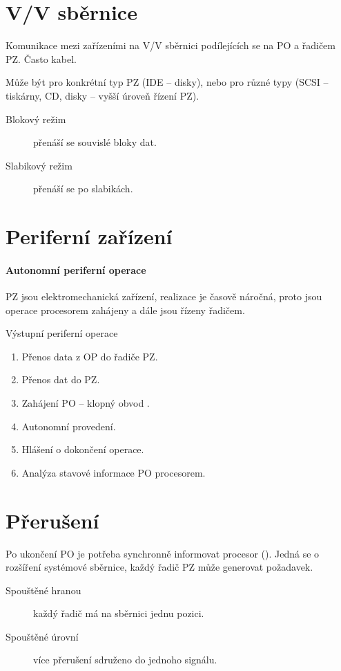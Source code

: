 \documentclass[a4wide]{report}
\begin{document}
\section{V/V sběrnice}

Komunikace mezi zařízeními na V/V sběrnici podílejících se na PO a řadičem PZ. Často kabel.

Může být pro konkrétní typ PZ (IDE -- disky), nebo pro různé typy (SCSI -- tiskárny, CD, disky -- vyšší úroveň řízení PZ).

\begin{description}
	\item[Blokový režim] přenáší se souvislé bloky dat.
	\item[Slabikový režim] přenáší se po slabikách.
\end{description}

\section{Periferní zařízení}

\paragraph{Autonomní periferní operace}
PZ jsou elektromechanická zařízení, realizace je časově náročná, proto jsou operace procesorem zahájeny a dále jsou řízeny řadičem.

Výstupní periferní operace
\begin{enumerate}
	\item Přenos data z OP do řadiče PZ.
	\item Přenos dat do PZ.
	\item Zahájení PO -- klopný obvod .
	\item Autonomní provedení.
	\item Hlášení o dokončení operace.
	\item Analýza stavové informace PO procesorem.
\end{enumerate}

\section{Přerušení}

Po ukončení PO je potřeba synchronně informovat procesor (). Jedná se o rozšíření systémové sběrnice, každý řadič PZ může generovat požadavek.


\begin{description}
	\item[Spouštěné hranou] každý řadič má na sběrnici jednu pozici.
	\item[Spouštěné úrovní] více přerušení sdruženo do jednoho signálu.
\end{description}
\end{document}
